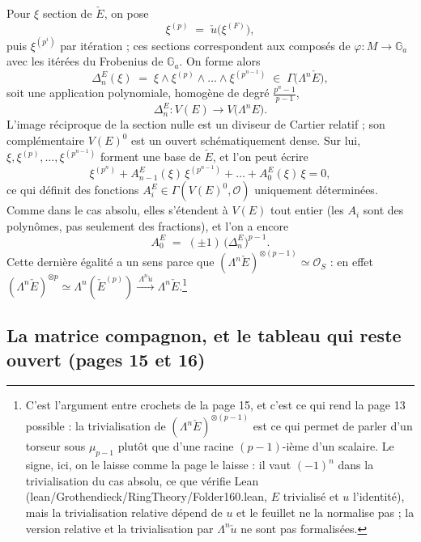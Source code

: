 \documentclass[11pt,a4paper]{article}
\begin{document}
Pour $\xi$ section de $\check{E}$, on pose
\[
  \xi^{(p)} \;=\; \check{u}\bigl(\xi^{(F)}\bigr) ,
\]
puis $\xi^{(p^i)}$ par itération ; ces sections correspondent aux composés de
$\varphi : M \to \mathbb{G}_a$ avec les itérées du Frobenius de
$\mathbb{G}_a$. On forme alors
\[
  \Delta_n^E(\xi) \;=\; \xi \wedge \xi^{(p)} \wedge \dots \wedge
  \xi^{(p^{n-1})} \;\in\; \Gamma\bigl(\Lambda^n \check{E}\bigr) ,
\]
soit une application polynomiale, homogène de degré
$\frac{p^n - 1}{p - 1}$,
\[
  \Delta_n^E : V(E) \longrightarrow V\bigl(\Lambda^n E\bigr) .
\]
L'image réciproque de la section nulle est un diviseur de Cartier relatif ;
son complémentaire $V(E)^0$ est un ouvert schématiquement dense. Sur lui,
$\xi, \xi^{(p)}, \dots, \xi^{(p^{n-1})}$ forment une base de $\check{E}$, et
l'on peut écrire
\[
  \xi^{(p^n)} + A^E_{n-1}(\xi)\,\xi^{(p^{n-1})} + \dots + A^E_0(\xi)\,\xi
  = 0 ,
\]
ce qui définit des fonctions
$A^E_i \in \Gamma(V(E)^0, \mathcal{O})$ uniquement déterminées. Comme dans le
cas absolu, elles s'étendent à $V(E)$ tout entier (les $A_i$ sont des
polynômes, pas seulement des fractions), et l'on a encore
\[
  A^E_0 \;=\; (\pm 1)\,\bigl(\Delta_n^E\bigr)^{p-1} .
\]
Cette dernière égalité a un sens parce que
$(\Lambda^n \check{E})^{\otimes (p-1)} \simeq \mathcal{O}_S$ :
en effet $(\Lambda^n \check{E})^{\otimes p} \simeq
\Lambda^n(\check{E}^{(p)}) \xrightarrow{\ \Lambda^n \check{u}\ }
\Lambda^n \check{E}$.\footnote{C'est l'argument entre crochets de
la page 15, et c'est ce qui rend la page 13 possible : la trivialisation de
$(\Lambda^n \check{E})^{\otimes(p-1)}$ est ce qui permet de parler d'un
torseur sous $\mu_{p-1}$ plutôt que d'une racine $(p-1)$-ième d'un scalaire.
Le signe, ici, on le laisse comme la page le laisse : il vaut $(-1)^n$ dans
la trivialisation du cas absolu, ce que vérifie Lean
(lean/Grothendieck/RingTheory/Folder160.lean, $E$ trivialisé et $u$ l'identité), mais la
trivialisation relative dépend de $u$ et le feuillet ne la normalise pas ; la
version relative et la trivialisation par $\Lambda^n \check{u}$ ne sont pas
formalisées.}

\subsection*{La matrice compagnon, et le tableau qui reste ouvert (pages 15 et 16)}
\end{document}
